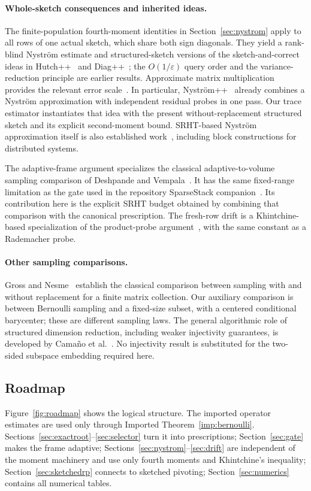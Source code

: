 \documentclass[11pt,a4paper]{article}
\theoremstyle{definition}
\theoremstyle{remark}
\numberwithin{equation}{section}
\newcommand{\eps}{\varepsilon}
\begin{document}
\paragraph{Whole-sketch consequences and inherited ideas.}
The finite-population fourth-moment identities in
Section~\ref{sec:nystrom} apply to all rows of one actual sketch, which
share both sign diagonals. They yield a rank-blind Nystr\"om estimate and
structured-sketch versions of the sketch-and-correct ideas in
Hutch++~\cite{Hutchpp} and Diag++~\cite{BN}; the $O(1/\eps)$ query order
and the variance-reduction principle are earlier results. Approximate
matrix multiplication provides the relevant error scale~\cite{DKM}.
In particular, Nystr\"om++~\cite{Nystrompp} already combines a Nystr\"om
approximation with independent residual probes in one pass. Our trace
estimator instantiates that idea with the present without-replacement
structured sketch and its explicit second-moment bound.
SRHT-based Nystr\"om approximation itself is also established
work~\cite{BBGL}, including block constructions for distributed systems.

The adaptive-frame argument specializes the classical adaptive-to-volume
sampling comparison of Deshpande and Vempala~\cite[Proposition~7]{DV}.
It has the same fixed-range limitation as the gate used in the repository
SparseStack companion~\cite{SparseCompanion}. Its contribution here is the
explicit SRHT budget obtained by combining that comparison with the
canonical prescription. The fresh-row drift is a Khintchine-based
specialization of the product-probe argument~\cite{PP}, with the same
constant as a Rademacher probe.

\paragraph{Other sampling comparisons.}
Gross and Nesme~\cite{GrossNesme} establish the classical comparison
between sampling with and without replacement for a finite matrix
collection. Our auxiliary comparison is between Bernoulli sampling and a
fixed-size subset, with a centered conditional barycenter; these are
different sampling laws. The general algorithmic role of structured
dimension reduction, including weaker injectivity guarantees, is developed
by Cama\~no et al.~\cite{CEMT}. No injectivity result is substituted for the
two-sided subspace embedding required here.

\subsection{Roadmap}
Figure~\ref{fig:roadmap} shows the logical structure. The imported
operator estimates are used only through Imported
Theorem~\ref{imp:bernoulli}. Sections~\ref{sec:exactroot}--\ref{sec:selector}
turn it into prescriptions; Section~\ref{sec:gate} makes the frame adaptive;
Sections~\ref{sec:nystrom}--\ref{sec:drift} are independent of the moment
machinery and use only fourth moments and Khintchine's inequality;
Section~\ref{sec:sketchedrp} connects to sketched pivoting;
Section~\ref{sec:numerics} contains all numerical tables.
\end{document}
